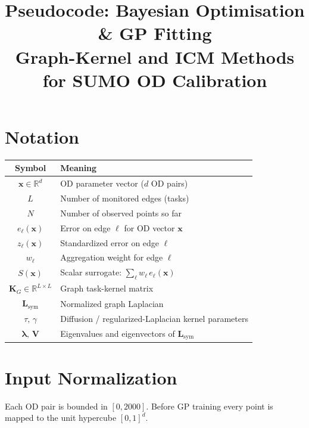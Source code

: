 \documentclass[11pt]{article}
\title{\textbf{Pseudocode: Bayesian Optimisation \& GP Fitting}\\
\large Graph-Kernel and ICM Methods for SUMO OD Calibration}
\author{}
\date{}
\begin{document}
\maketitle
\tableofcontents
\newpage

\section{Notation}

\begin{center}
\begin{tabular}{cl}
\toprule
Symbol & Meaning \\
\midrule
$\mathbf{x} \in \mathbb{R}^d$ & OD parameter vector ($d$ OD pairs) \\
$L$ & Number of monitored edges (tasks) \\
$N$ & Number of observed points so far \\
$e_\ell(\mathbf{x})$ & Error on edge $\ell$ for OD vector $\mathbf{x}$ \\
$z_\ell(\mathbf{x})$ & Standardized error on edge $\ell$ \\
$w_\ell$ & Aggregation weight for edge $\ell$ \\
$S(\mathbf{x})$ & Scalar surrogate: $\sum_\ell w_\ell\, e_\ell(\mathbf{x})$ \\
$\mathbf{K}_G \in \mathbb{R}^{L \times L}$ & Graph task-kernel matrix \\
$\mathbf{L}_{\mathrm{sym}}$ & Normalized graph Laplacian \\
$\tau,\, \gamma$ & Diffusion / regularized-Laplacian kernel parameters \\
$\bm{\lambda},\, \mathbf{V}$ & Eigenvalues and eigenvectors of $\mathbf{L}_{\mathrm{sym}}$ \\
\bottomrule
\end{tabular}
\end{center}

\section{Input Normalization}

Each OD pair is bounded in $[0, 2000]$. Before GP training every point is mapped
to the unit hypercube $[0,1]^d$.
\end{document}
